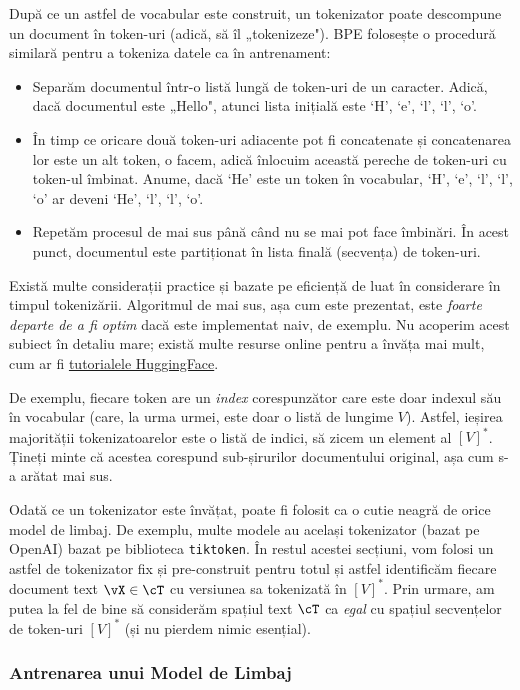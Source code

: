 \documentclass[../../book-main_ro.tex]{subfiles}
\begin{document}
După ce un astfel de vocabular este construit, un tokenizator poate descompune un document în token-uri (adică, să îl „tokenizeze"). BPE folosește o procedură similară pentru a tokeniza datele ca în antrenament:
\begin{itemize}
    \item Separăm documentul într-o listă lungă de token-uri de un caracter. Adică, dacă documentul este „Hello", atunci lista inițială este `H', `e', `l', `l', `o'. 
    \item În timp ce oricare două token-uri adiacente pot fi concatenate și concatenarea lor este un alt token, o facem, adică înlocuim această pereche de token-uri cu token-ul îmbinat. Anume, dacă `He' este un token în vocabular, `H', `e', `l', `l', `o' ar deveni `He', `l', `l', `o'.
    \item Repetăm procesul de mai sus până când nu se mai pot face îmbinări. În acest punct, documentul este partiționat în lista finală (secvența) de token-uri.
\end{itemize}

Există multe considerații practice și bazate pe eficiență de luat în considerare în timpul tokenizării. Algoritmul de mai sus, așa cum este prezentat, este \textit{foarte departe de a fi optim} dacă este implementat naiv, de exemplu. Nu acoperim acest subiect în detaliu mare; există multe resurse online pentru a învăța mai mult, cum ar fi \href{https://huggingface.co/learn/nlp-course/en/chapter6/5}{tutorialele HuggingFace}.

De exemplu, fiecare token are un \textit{index} corespunzător care este doar indexul său în vocabular (care, la urma urmei, este doar o listă de lungime \(V\)). Astfel, ieșirea majorității tokenizatoarelor este o listă de indici, să zicem un element al \([V]^{*}\). Țineți minte că acestea corespund sub-șirurilor documentului original, așa cum s-a arătat mai sus.

Odată ce un tokenizator este învățat, poate fi folosit ca o cutie neagră de orice model de limbaj. De exemplu, multe modele au același tokenizator (bazat pe OpenAI) bazat pe biblioteca \texttt{tiktoken}. În restul acestei secțiuni, vom folosi un astfel de tokenizator fix și pre-construit pentru totul și astfel identificăm fiecare document text \(\vX \in \cT\) cu versiunea sa tokenizată în \([V]^{*}\). Prin urmare, am putea la fel de bine să considerăm spațiul text \(\cT\) ca \textit{egal} cu spațiul secvențelor de token-uri \([V]^{*}\) (și nu pierdem nimic esențial).

\subsubsection{Antrenarea unui Model de Limbaj}
\end{document}
